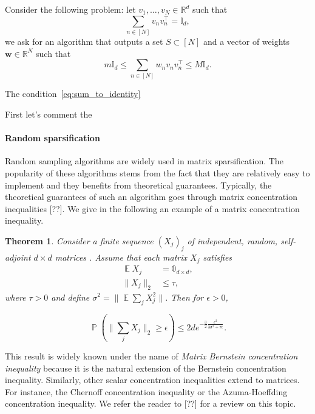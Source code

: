 \documentclass[twoside,11pt]{book}
\newtheorem{theorem}{Theorem}
\numberwithin{theorem}{chapter}
\numberwithin{definition}{chapter}
\numberwithin{proposition}{chapter}
\numberwithin{corollary}{chapter}
\numberwithin{example}{chapter}
\numberwithin{lemma}{chapter}
\DeclareMathOperator{\Tran}{\intercal}
\DeclareMathOperator{\EX}{\mathbb{E}}
\DeclareMathOperator{\Prb}{\mathbb{P}}
\begin{document}
Consider the following problem: let $v_{1}, \dots, v_{N} \in \mathbb{R}^{d}$ such that
\begin{equation}
 \sum\limits_{n \in [N]} v_{n} v_{n}^{\Tran} = \mathbb{I}_{d},
\end{equation}
we ask for an algorithm that outputs a set $S \subset [N]$ and a vector of weights $\bm{w}\in \mathbb{R}^{N}$ such that
\begin{equation}
m \mathbb{I}_{d} \leq \sum\limits_{n \in [N]} w_{n}v_{n}v_{n}^{\Tran} \leq M \mathbb{I}_{d}.
\end{equation} 


The condition~\eqref{eq:sum_to_identity} 

First let's comment the 


\paragraph{Random sparsification}
Random sampling algorithms are widely used in matrix sparsification. The popularity of these algorithms stems from the fact that they are relatively easy to implement and they benefits from theoretical guarantees.  Typically, the theoretical guarantees of such an algorithm goes through matrix concentration inequalities [??]. We give in the following an example of a matrix concentration inequality. 


\begin{theorem}\label{thm:matrix_bernstein}
Consider a finite sequence $(X_{j})_{j}$ of independent, random, self-adjoint $d\times d$ matrices . Assume that each matrix $X_{j}$
satisfies 
\begin{align}
 \EX X_{j} &= \mathbb{0}_{d \times d},\\
 \|X_{j}\|_{2} &\leq \tau,
\end{align}
where $\tau >0$ and define $\sigma^{2} = \|\EX \sum\limits_{j} X_{j}^{2}\|$.
 Then for $\epsilon >0$, 

\begin{equation}
\Prb \left( \|\sum\limits_{j} X_{j}\|_{2} \geq \epsilon \right) \leq 2 d e^{-\frac{3}{2} \frac{\epsilon^{2}}{3\sigma^{2} + \tau \epsilon}}.
\end{equation}

\end{theorem}

This result is widely known under the name of \emph{Matrix Bernstein concentration inequality} because it is the natural extension of the Bernstein concentration inequality. Similarly, other scalar concentration inequalities extend to matrices. For instance, the Chernoff concentration inequality or the Azuma-Hoeffding concentration inequality. We refer the reader to [??] for a review on this topic. 
\end{document}
